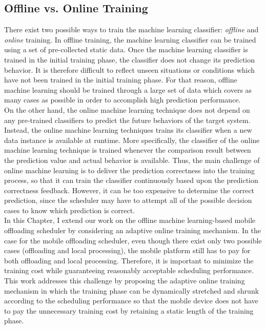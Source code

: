 \subsection{Offline vs. Online Training}
\label{online:training}
There exist two possible ways to train the machine learning
classifier: \textit{offline} and \textit{online} training.
%
In offline training, the machine learning classifier can be trained
using a set of pre-collected static data.
%
Once the machine learning classifier is trained in the initial training
phase, the classifier does not change its prediction behavior.
%
It is therefore difficult to reflect unseen situations or conditions
which have not been trained in the initial training phase.
%
For that reason, offline machine learning should be trained through a
large set of data which covers as many cases as possible in order to
accomplish high prediction performance.\\
%
On the other hand, the online machine learning technique does
not depend on any pre-trained classifiers to predict the future
behaviors of the target system.
%
Instead, the online machine learning techniques trains its classifier
when a new data instance is available at runtime.
%
More specifically, the classifier of the online machine learning
technique is trained whenever the comparison result between the
prediction value and actual behavior is available.
%
Thus, the main challenge of online machine learning is to deliver the
prediction correctness into the training process, so that it can train
the classifier continuously based upon the prediction correctness feedback.
%
However, it can be too expensive to determine the correct prediction,
since the scheduler may have to attempt all of the possible decision
cases to know which prediction is correct.\\
%
In this Chapter, I extend our work on the offline
machine learning-based mobile offloading scheduler by considering an
adaptive online training mechanism.
%
In the case for the mobile offloading scheduler, even though
there exist only two possible cases (offloading and local processing),
the mobile platform still has to pay for both offloading and local
processing.  
%
Therefore, it is important to minimize the training cost while
guaranteeing reasonably acceptable scheduling performance.
%
This work addresses this challenge by proposing the adaptive online training
mechanism in which the training phase can be dynamically stretched and
shrunk according to the scheduling performance so that the mobile device
does not have to pay the unnecessary training cost by retaining a static
length of the training phase. 
%

